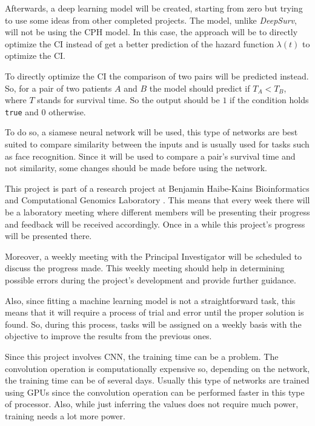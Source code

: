 Afterwards, a deep learning model will be created, starting from zero but trying to use some
ideas from other completed projects. The model, unlike \emph{DeepSurv}, will not be using
the \gls{CPH} model. In this case, the approach will be to directly optimize the \gls{CI}
instead of get a better prediction of the hazard function \( \lambda(t) \) to optimize 
the \gls{CI}.

To directly optimize the \gls{CI} the comparison of two pairs will be predicted instead. So,
for a pair of two patients \( A \) and \( B \) the model should predict if \( T_A < T_B \),
where \( T \) stands for survival time. So the output should be \( 1 \) if the condition holds
\texttt{true} and \( 0 \) otherwise.

To do so, a siamese neural network will be used,
this type of networks are best suited to compare similarity between the inputs and is usually
used for tasks such as face recognition. Since it will be used to compare a pair's survival
time and not similarity, some changes should be made before using the network.


This project is part of a research project at Benjamin Haibe-Kains Bioinformatics and 
Computational Genomics Laboratory \cite{bhklab}. This means that every week there will be a 
laboratory meeting where different members will be presenting their progress and feedback will
be received accordingly. Once in a while this project's progress will be presented there.

Moreover, a weekly meeting with the Principal Investigator will be scheduled to discuss
the progress made. This weekly meeting should help in determining possible errors during the 
project's development and provide further guidance.

Also, since fitting a machine learning model is not a straightforward task, this means that 
it will require a process of trial and error until the proper solution is found. 
So, during this process, tasks will be assigned on a weekly basis with the objective to
improve the results from the previous ones.



Since this project involves \gls{CNN}, the training time can be a problem. 
The convolution operation is computationally expensive so, depending on the network, the 
training time can be of several days. Usually this type of networks are trained using 
\glspl{GPU} since the convolution operation can be performed faster in this type of processor. 
Also, while just inferring the values does not require
much power, training needs a lot more power. 

